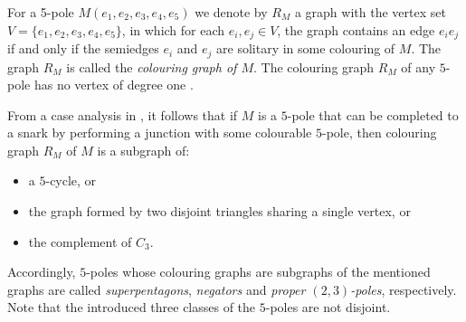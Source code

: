 For a 5-pole $M(e_1,e_2,e_3,e_4,e_5)$ we denote by $R_M$ a graph with the vertex set $V=\{e_1,e_2,e_3,e_4,e_5\}$, in which for each $e_i,e_j\in V$, the graph contains an edge $e_ie_j$ if and only if the semiedges $e_i$ and $e_j$ are solitary in some colouring of $M$. The graph $R_M$ is called the \textit{colouring graph of $M$}.
The colouring graph $R_M$ of any $5$-pole has no vertex of degree one \cite{Preissmann1983}.

%
%

From a case analysis in \cite{Preissmann1983}, it follows that if $M$ is a $5$-pole that can be completed to a snark by performing a junction with some colourable $5$-pole, then colouring graph $R_{M}$ of $M$ is a subgraph of:
\begin{itemize}
\item a $5$-cycle, or
\item the graph formed by two disjoint triangles sharing a single vertex, or
\item the complement of $C_3$.
\end{itemize}
Accordingly, $5$-poles whose colouring graphs are subgraphs of the mentioned graphs are called \textit{superpentagons}, \textit{negators} and \textit{proper $(2 ,3)$-poles}, respectively. Note that the introduced three classes of the $5$-poles are not disjoint.

